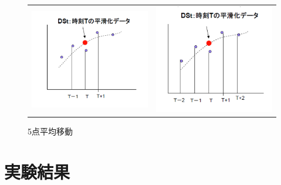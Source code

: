 \documentclass[a4paper,11pt]{jsarticle}
\begin{document}
    \begin{figure}[H]
      \begin{tabular}{cc}
        \begin{minipage}[t]{0.48\textwidth}
          \centering
          \includegraphics[clip,width=6cm]{picture/tanjun3.png}
          \caption{3点平均移動}
          \label{GR_tanjun3}
        \end{minipage} &
        \begin{minipage}[t]{0.48\textwidth}
          \centering
          \includegraphics[clip,width=6cm]{picture/tanjun5.png}
          \caption{5点平均移動}
          \label{GR_tanjun5}
        \end{minipage}
      \end{tabular}
    \end{figure}

\section{実験結果}
\end{document}
